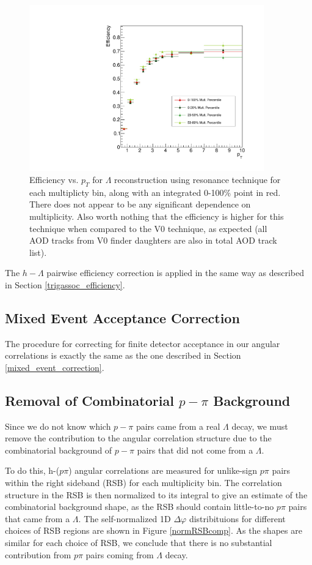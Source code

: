\documentclass[ALICE,manyauthors]{ALICE_analysis_notes}
\begin{document}
\begin{figure}[ht]
\centering
\includegraphics[width=4in]{figures/res_efficiency.pdf}
\caption{Efficiency vs. $p_T$ for $\Lambda$ reconstruction using resonance technique for each multiplicty bin, along with an integrated 0-100\% point in red. There does not appear to be any significant dependence on multiplicity. Also worth nothing that the efficiency is higher for this technique when compared to the V0 technique, as expected (all AOD tracks from V0 finder daughters are also in total AOD track list).}
\label{lambda_eff_res}
\end{figure}

The $h-\Lambda$ pairwise efficiency correction is applied in the same way as described in Section \ref{trigassoc_efficiency}.

\subsection{Mixed Event Acceptance Correction}
\label{mixed_event_res}
The procedure for correcting for finite detector acceptance in our angular correlations is exactly the same as the one described in Section \ref{mixed_event_correction}.


\subsection{Removal of Combinatorial $p-\pi$ Background}
\label{removecomb}

Since we do not know which $p-\pi$ pairs came from a real $\Lambda$ decay, we must remove the contribution to the angular correlation structure due to the combinatorial background of $p-\pi$ pairs that did not come from a $\Lambda$.

To do this, h-($p\pi$) angular correlations are measured for unlike-sign $p\pi$ pairs within the right sideband (RSB) for each multiplicity bin. The correlation structure in the RSB is then normalized to its integral to give an estimate of the combinatorial background shape, as the RSB should contain little-to-no $p\pi$ pairs that came from a $\Lambda$. The self-normalized 1D $\Delta\varphi$ distribituions for different choices of RSB regions are shown in Figure \ref{normRSBcomp}. As the shapes are similar for each choice of RSB, we conclude that there is no substantial contribution from $p\pi$ pairs coming from $\Lambda$ decay.
\end{document}
